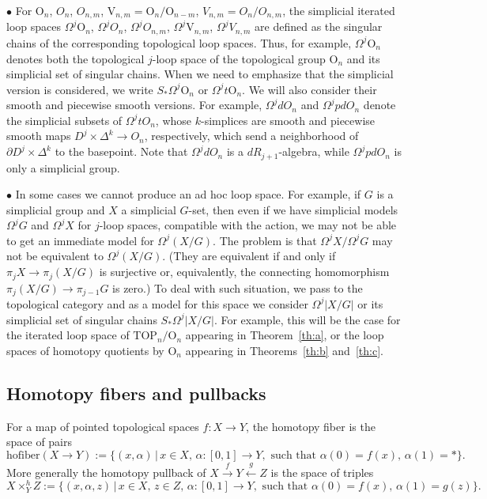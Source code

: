 \documentclass[11pt]{amsart}
\theoremstyle{definition}
\newcommand{\TOP}{\mathrm{TOP}}
\newcommand{\OO}{\mathrm{O}}
\newcommand{\VV}{\mathrm{V}}
\newcommand{\hofiber}{\mathrm{hofiber}}
\numberwithin{equation}{section}
\begin{document}
$\bullet$ For $\OO_n$, $O_n$, $O_{n,m}$, $\VV_{n,m}=\OO_n/\OO_{n-m}$, $V_{n,m}=O_n/O_{n,m}$, the simplicial iterated loop spaces
 $\Omega^j\OO_n$, $\Omega^j O_n$, $\Omega^j O_{n,m}$, $\Omega^j\VV_{n,m}$, $\Omega^j V_{n,m}$ are defined as the singular chains of the
 corresponding topological loop spaces. Thus, for example, $\Omega^j\OO_n$ denotes both the topological $j$-loop space of the topological group $\OO_n$ and
 its simplicial set of singular chains. When we need to emphasize that the simplicial version is considered, we write $S_*\Omega^j\OO_n$ or $\Omega^j t\OO_n$.
 We will also consider their smooth and piecewise smooth versions. For example, $\Omega^j dO_n$ and $\Omega^j pdO_n$ denote the simplicial subsets of $\Omega^j tO_n$, whose $k$-simplices are smooth and piecewise smooth maps $D^j\times\Delta^k\to O_n$, respectively, which send a neighborhood of 
 $\partial D^j\times \Delta^k$ to the basepoint. Note that $\Omega^j dO_n$ is a $dR_{j+1}$-algebra, while $\Omega^j pdO_n$  is only a simplicial group.
 

$\bullet$ In some cases we cannot produce an ad hoc loop space. For example, if $G$ is a simplicial group and $X$ a simplicial $G$-set, then even if we have
simplicial models $\Omega^j G$ and $\Omega^j X$ for $j$-loop spaces, compatible with the action, we may not be able to get an immediate model for
 $\Omega^j(X/G)$. The problem is that $\Omega^j X/\Omega^j G$ may not be equivalent to $\Omega^j(X/G)$. (They are equivalent if and only if  $\pi_j X\to\pi_j (X/G)$ is surjective or, equivalently, the connecting
 homomorphism $\pi_j(X/G) \to \pi_{j-1} G$ is zero.) To deal with such situation, we pass to the topological category and as a model for this space we consider
 $\Omega^j|X/G|$ or its simplicial set of singular chains $S_*\Omega^j|X/G|$. For example, this will be the case for the iterated loop space of $\TOP_n/\OO_n$ appearing
 in Theorem~\ref{th:a}, or the loop spaces of homotopy quotients by $\OO_n$ appearing in Theorems~\ref{th:b} and~\ref{th:c}.



\subsection{Homotopy fibers and pullbacks}\label{ss:hofib}
For a map of pointed topological spaces $f\colon X\to Y$, the homotopy fiber is the space of pairs 
\[
\hofiber(X\to Y):=\{(x,\alpha)\,|\, x\in X,\, \alpha\colon [0,1]\to Y, \text{ such that } \alpha(0)=f(x),\, \alpha(1)=*\}.
\]
More generally the homotopy pullback of %
$X\xrightarrow{f} Y\xleftarrow{g} Z$ is the space of triples
\[
X\times_Y^h Z:=\{(x,\alpha,z)\,|\, x\in X,\, z\in Z,\,   \alpha\colon [0,1]\to Y, \text{ such that } \alpha(0)=f(x),\, \alpha(1)=g(z)\}.
\]
\end{document}
